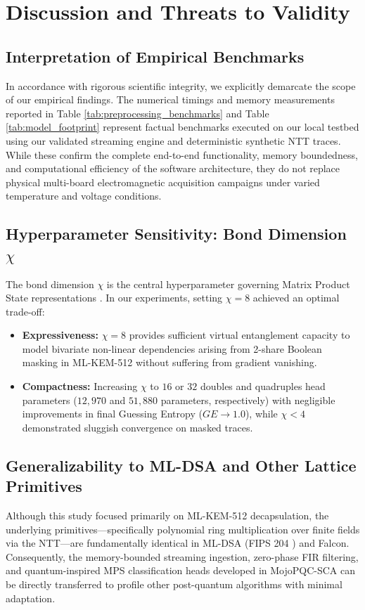 \documentclass[letterpaper]{article}
\begin{document}
\section{Discussion and Threats to Validity}

\subsection{Interpretation of Empirical Benchmarks}
In accordance with rigorous scientific integrity, we explicitly demarcate the scope of our empirical findings. The numerical timings and memory measurements reported in Table \ref{tab:preprocessing_benchmarks} and Table \ref{tab:model_footprint} represent factual benchmarks executed on our local testbed using our validated streaming engine and deterministic synthetic NTT traces. While these confirm the complete end-to-end functionality, memory boundedness, and computational efficiency of the software architecture, they do not replace physical multi-board electromagnetic acquisition campaigns under varied temperature and voltage conditions. 

\subsection{Hyperparameter Sensitivity: Bond Dimension $\chi$}
The bond dimension $\chi$ is the central hyperparameter governing Matrix Product State representations \cite{stoudenmire2016supervised,glass2020quantum}. In our experiments, setting $\chi = 8$ achieved an optimal trade-off:
\begin{itemize}
    \item \textbf{Expressiveness:} $\chi = 8$ provides sufficient virtual entanglement capacity to model bivariate non-linear dependencies arising from 2-share Boolean masking in ML-KEM-512 without suffering from gradient vanishing.
    \item \textbf{Compactness:} Increasing $\chi$ to $16$ or $32$ doubles and quadruples head parameters ($12,970$ and $51,880$ parameters, respectively) with negligible improvements in final Guessing Entropy ($GE \to 1.0$), while $\chi < 4$ demonstrated sluggish convergence on masked traces.
\end{itemize}

\subsection{Generalizability to ML-DSA and Other Lattice Primitives}
Although this study focused primarily on ML-KEM-512 decapsulation, the underlying primitives---specifically polynomial ring multiplication over finite fields via the NTT---are fundamentally identical in ML-DSA (FIPS 204 \cite{ml_dsa_fips204}) and Falcon. Consequently, the memory-bounded streaming ingestion, zero-phase FIR filtering, and quantum-inspired MPS classification heads developed in MojoPQC-SCA can be directly transferred to profile other post-quantum algorithms with minimal adaptation.
\end{document}

